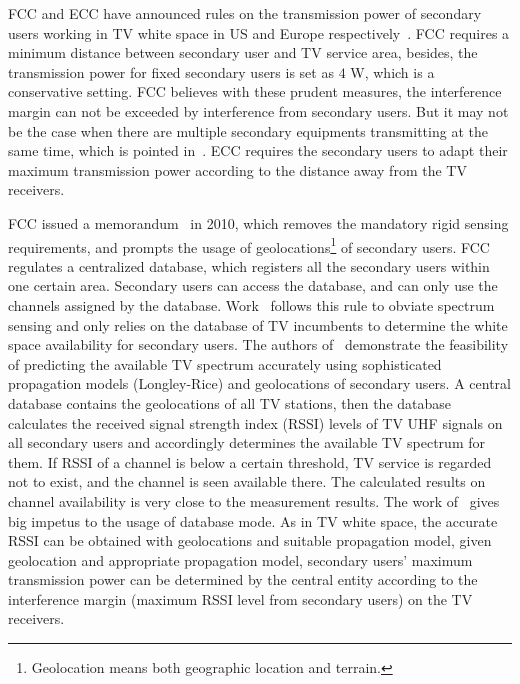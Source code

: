 \gls{FCC} and \gls{ECC} have announced rules on the transmission power of secondary users working in TV white space in US and Europe respectively~\cite{FCC_2010_sedond_memorandumm, ecc159}. 
FCC requires a minimum distance between secondary user and TV service area, besides, the transmission power for fixed secondary users is set as $4$ \textup{W}, which is a conservative setting. %
FCC believes with these prudent measures, the interference margin can not be exceeded by interference from secondary users.
But it may not be the case when there are multiple secondary equipments transmitting at the same time, which is pointed in~\cite{Jaentti11}.
ECC requires the secondary users to adapt their maximum transmission power according to the distance away from the TV receivers.

FCC issued a memorandum~\cite{FCC_2010_sedond_memorandumm,FCCdatabasae} in 2010, which removes the mandatory rigid sensing requirements, and prompts the usage of geolocations\footnote{Geolocation means both geographic location and terrain.} of secondary users.
FCC regulates a centralized database, which registers all the secondary users within one certain area.
Secondary users can access the database, and can only use the channels assigned by the database.
Work~\cite{SenseLess2011} follows this rule to obviate spectrum sensing and only relies on the database of TV incumbents to determine the white space availability for secondary users. 
The authors of~\cite{SenseLess2011} demonstrate the feasibility of predicting the available TV spectrum accurately using sophisticated propagation models (Longley-Rice) and geolocations of secondary users. 
A central database contains the geolocations of all TV stations, then the database calculates the received signal strength index (\gls{RSSI}) levels of TV \gls{UHF} signals on all secondary users and accordingly determines the available TV spectrum for them. 
If RSSI of a channel is below a certain threshold, TV service is regarded not to exist, and the channel is seen available there.
The calculated results on channel availability is very close to the measurement results.
The work of~\cite{SenseLess2011} gives big impetus to the usage of database mode.
%
As in TV white space, the accurate RSSI can be obtained with geolocations and suitable propagation model, given geolocation and appropriate propagation model, secondary users' maximum transmission power can be determined by the central entity according to the interference margin (maximum RSSI level from secondary users) on the TV receivers. 

